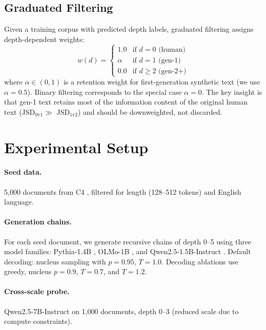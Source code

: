 \documentclass[11pt,a4paper]{article}
\begin{document}
\subsection{Graduated Filtering}
\label{sec:filtering}

Given a training corpus with predicted depth labels, graduated filtering assigns depth-dependent weights:
\begin{equation}
w(d) = \begin{cases}
1.0 & \text{if } d = 0 \text{ (human)} \\
\alpha & \text{if } d = 1 \text{ (gen-1)} \\
0.0 & \text{if } d \geq 2 \text{ (gen-2+)}
\end{cases}
\label{eq:weights}
\end{equation}
where $\alpha \in (0, 1)$ is a retention weight for first-generation synthetic text (we use $\alpha{=}0.5$). Binary filtering corresponds to the special case $\alpha{=}0$. The key insight is that gen-1 text retains most of the information content of the original human text (JSD$_{0\text{v}1} \gg$ JSD$_{1\text{v}2}$) and should be downweighted, not discarded.

\section{Experimental Setup}
\label{sec:setup}

\paragraph{Seed data.} 5,000 documents from C4 \citep{raffel2020c4}, filtered for length (128--512 tokens) and English language.

\paragraph{Generation chains.} For each seed document, we generate recursive chains of depth 0--5 using three model families: Pythia-1.4B \citep{biderman2023pythia}, OLMo-1B \citep{groeneveld2024olmo}, and Qwen2.5-1.5B-Instruct \citep{qwen2025qwen25}. Default decoding: nucleus sampling with $p{=}0.95$, $T{=}1.0$. Decoding ablations use greedy, nucleus $p{=}0.9$, $T{=}0.7$, and $T{=}1.2$.

\paragraph{Cross-scale probe.} Qwen2.5-7B-Instruct on 1,000 documents, depth 0--3 (reduced scale due to compute constraints).
\end{document}
